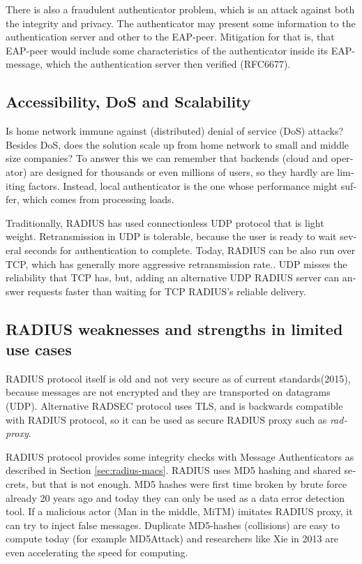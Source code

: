 \documentclass[12pt,a4paper,english]{tutthesis}
\begin{document}
\begin{otherlanguage}{english}
There is also a fraudulent authenticator problem, which is an attack
against both the integrity and privacy.  The authenticator may present
some information to the authentication server and other to the
EAP-peer. Mitigation for that is, that EAP-peer would include some
characteristics of the authenticator inside its EAP-message, which
the authentication server then verified (RFC6677)\cite{rfc6677}.

\subsection{Accessibility, DoS and Scalability}
\label{sec-6-1-3}

Is home network immune against (distributed) denial of service (DoS)
attacks? Besides DoS, does the solution scale up from home network to
small and middle size companies?
To answer this we can remember that backends (cloud and operator) are
designed for thousands or even millions of users, so 
they hardly are limiting factors. Instead, local
authenticator is the one whose performance might suffer, which
comes from processing loads\cite{2009-lin-simefficiency}.


Traditionally, RADIUS has used connection\-less UDP protocol that is
light weight. Retransmission in UDP is tolerable, because the user is
ready to wait several seconds for authentication to complete.  
Today, RADIUS can be also run over TCP, which has generally more
aggressive retransmission rate.\cite[Section 2.2.1]{rfc5080}.
UDP misses the reliability that TCP has, but, adding an alternative UDP RADIUS
server can answer requests faster than waiting for TCP RADIUS's reliable delivery.


\subsection{RADIUS weaknesses and strengths in limited use cases}
\label{sec-6-1-4}


RADIUS protocol itself is old and not very secure as of current
standards(2015), because messages are not encrypted and they are
transported on datagrams (UDP). Alternative RADSEC protocol uses TLS, and 
is backwards compatible with RADIUS protocol, so it can be used
as secure RADIUS proxy such as \emph{radproxy}\cite{uninett-radproxy}.

RADIUS protocol provides some integrity checks with Message
Authenticators as described in Section \ref{sec:radius-macs}.  RADIUS uses
MD5 hashing and shared secrets, but that is not enough.  MD5 hashes
were first time broken by brute force already 20 years ago and today
they can only be used as a data error detection
tool\cite[p.2]{rfc6151}.  If a malicious actor (Man in the middle,
MiTM) imitates RADIUS proxy, it can try to inject false messages.
Duplicate MD5-hashes (collisions) are easy to compute today (for 
example MD5Attack\cite{rfc5176}) and researchers like Xie in
2013\cite{xie2013fast}  are even accelerating the speed for
computing.


\end{otherlanguage}
\end{document}
